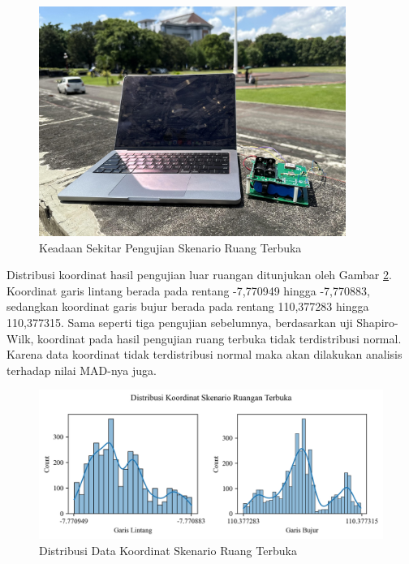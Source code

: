 \begin{figure}[H]
	\centering
	\includegraphics[width=10cm]{contents/chapter-4/4-skenario-outdoor/keadaan.jpg}
	\caption{Keadaan Sekitar Pengujian Skenario Ruang Terbuka}
	\label{Fig: outdoor-keadaan}
\end{figure}

Distribusi koordinat hasil pengujian luar ruangan ditunjukan oleh Gambar \ref{Fig:outdoor-distribution}. Koordinat garis lintang berada pada rentang -7,770949 hingga -7,770883, sedangkan koordinat garis bujur berada pada rentang 110,377283 hingga 110,377315. Sama seperti tiga pengujian sebelumnya, berdasarkan uji Shapiro-Wilk, koordinat pada hasil pengujian ruang terbuka tidak terdistribusi normal. Karena data koordinat tidak terdistribusi normal maka akan dilakukan analisis terhadap nilai MAD-nya juga.

\begin{figure}[H]
	\centering
	\begin{adjustbox}{width=\textwidth}
		\includegraphics{contents/chapter-4/4-skenario-outdoor/distribution.png}
	\end{adjustbox}
	\caption{Distribusi Data Koordinat Skenario Ruang Terbuka}
	\label{Fig:outdoor-distribution}
\end{figure}

